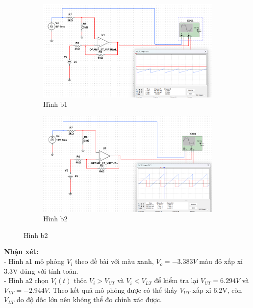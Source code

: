 \begin{figure}[H]
    \centering
    \begin{subfigure}[b]{0.48\textwidth}
        \centering
        \includegraphics[width=\textwidth]{image/C13_b.png}
        \caption*{Hình b1}
    \end{subfigure}
    \hfill
    \begin{subfigure}[b]{0.48\textwidth}
        \centering
        \includegraphics[width=\textwidth]{image/C13_b_1.png}
        \caption*{Hình b2}
    \end{subfigure}
\end{figure}

\textbf{Nhận xét:}\\
- Hình a1 mô phỏng $V_i$ theo đề bài với màu xanh, $V_o=-3.383V$ màu đỏ xấp xỉ 3.3V đúng với tính toán.\\
- Hình a2 chọn $V_i(t)$ thỏa $V_i>V_{UT}$ và $V_i<V_{LT}$ để kiểm tra lại $V_{UT}=6.294V$ và $V_{LT}=-2.944V$. 
Theo kết quả mô phỏng được có thể thấy $V_{UT}$ xấp xỉ 6.2V, còn $V_{LT}$ do độ dốc lớn nên không thể đo chính xác được.\\
